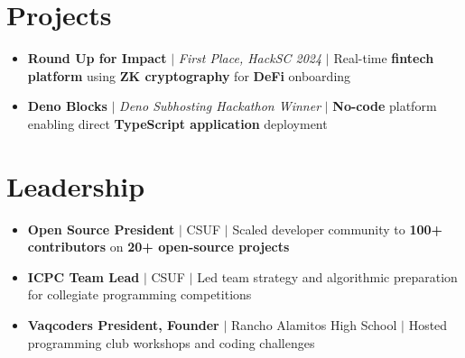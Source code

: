 \documentclass[letterpaper,11pt]{article}
\newcommand{\resumeItem}[1]{
  \item\small{
    {#1 \vspace{-2pt}}
  }
}
\newcommand{\resumeSubHeadingListStart}{\begin{itemize}[leftmargin=0.15in, label={}]}
\newcommand{\resumeSubHeadingListEnd}{\end{itemize}}
\begin{document}
\section{Projects}
\resumeSubHeadingListStart
  \resumeItem{\textbf{Round Up for Impact} $|$ \emph{First Place, HackSC 2024} $|$ Real-time \textbf{fintech platform} using \textbf{ZK cryptography} for \textbf{DeFi} onboarding}
  \resumeItem{\textbf{Deno Blocks} $|$ \emph{Deno Subhosting Hackathon Winner} $|$ \textbf{No-code} platform enabling direct \textbf{TypeScript application} deployment}
\resumeSubHeadingListEnd

\section{Leadership}
\resumeSubHeadingListStart
  \resumeItem{\textbf{Open Source President} $|$ CSUF $|$ Scaled developer community to \textbf{100+ contributors} on \textbf{20+ open-source projects}}
  \resumeItem{\textbf{ICPC Team Lead} $|$ CSUF $|$ Led team strategy and algorithmic preparation for collegiate programming competitions}
  \resumeItem{\textbf{Vaqcoders President, Founder} $|$ Rancho Alamitos High School $|$ Hosted programming club workshops and coding challenges}
\resumeSubHeadingListEnd

\end{document}
